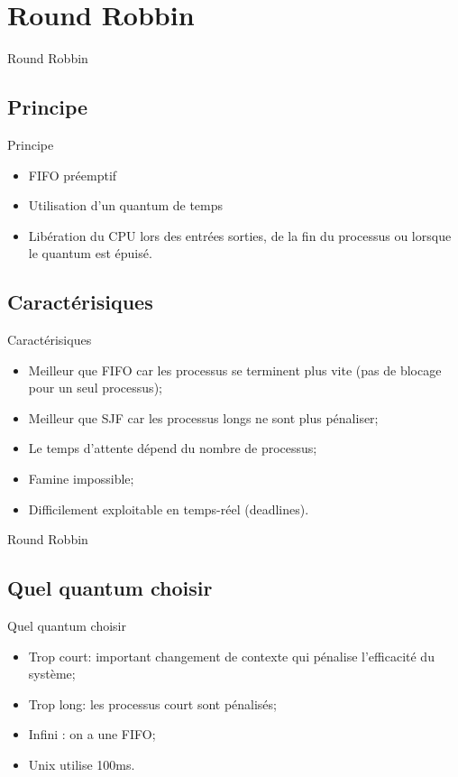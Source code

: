 \def\sectitle{Round Robbin}
\section{\sectitle}

\begin{frame}{\sectitle}
\def\subsectitle{Principe}
\subsection{\subsectitle}

\begin{exampleblock}{\subsectitle}
\begin{itemize}
    \item FIFO préemptif
    \item Utilisation d'un quantum de temps
    \item Libération du CPU lors des entrées sorties, de la fin du processus ou
    lorsque le quantum est épuisé.
\end{itemize}
\end{exampleblock}


\def\subsectitle{Caractérisiques}
\subsection{\subsectitle}
\begin{block}{\subsectitle}
\begin{itemize}
    \item Meilleur que FIFO car les processus se terminent plus vite (pas de
    blocage pour un seul processus);
    \item Meilleur que SJF car les processus longs ne sont plus pénaliser;
    \item Le temps d'attente dépend du nombre de processus;
    \item Famine impossible;
    \item Difficilement exploitable en temps-réel (deadlines).
\end{itemize}
\end{block}

\end{frame}

\begin{frame}{\sectitle}
\def\subsectitle{Quel quantum choisir}
\subsection{\subsectitle}

\begin{alertblock}{\subsectitle}
\begin{itemize}
    \item Trop court: important changement de contexte qui pénalise l'efficacité
    du système;
    \item Trop long: les processus court sont pénalisés;
    \item Infini : on a une FIFO;
    \item Unix utilise 100ms.
\end{itemize}
\end{alertblock}

\end{frame}


